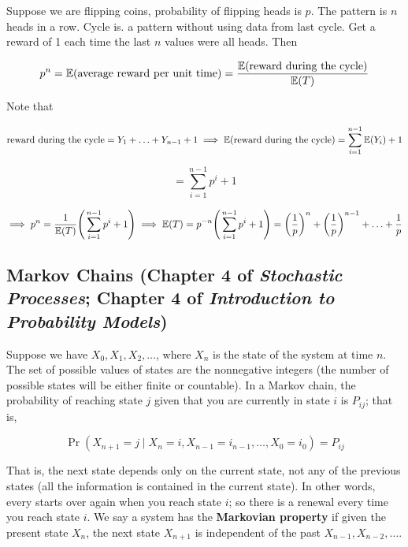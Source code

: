 \begin{example}Suppose we are flipping coins, probability of flipping heads is \(p\). The pattern is \(n\) heads in a row. Cycle is. a pattern without using data from last cycle. Get a reward of 1 each time the last \(n\) values were all heads. Then

\[
p^n = \E( \text{average reward per unit time})  =  \frac{ \E( \text{reward during the cycle}) }{\E(T)}
\]

Note that

\[
\text{reward during the cycle} = Y_1 + \ldots + Y_{n-1} + 1 \implies \E(\text{reward during the cycle} ) = \sum_{i=1}^{n-1} \E(Y_i) + 1  
\]

\[
 = \sum_{i=1}^{n-1} p^i + 1  
\]

\[
\implies p^n = \frac{ 1}{\E(T)} \Bigg( \sum_{i=1}^{n-1} p^i + 1  \Bigg) \implies \E(T) = p^{-n} \Bigg(  \sum_{i=1}^{n-1} p^i + 1 \Bigg) = \bigg( \frac{1}{p} \bigg)^n + \bigg( \frac{1}{p} \bigg)^{n-1} + \ldots + \frac{1}{p}
\]

\end{example}

\subsection{Markov Chains (Chapter 4 of \textit{Stochastic Processes}; Chapter 4 of \textit{Introduction to Probability Models})}

Suppose we have \(X_0, X_1, X_2, \ldots\), where \(X_n\) is the state of the system at time \(n\). The set of possible values of states are the nonnegative integers (the number of possible states will be either finite or countable). In a Markov chain, the probability of reaching state \(j\) given that you are currently in state \(i\) is \(P_{ij}\); that is,

\[
\Pr(X_{n+1} = j \mid X_n =i, X_{n-1} = i_{n-1}, \ldots, X_0 = i_0) = P_{ij}
\]

That is, the next state depends only on the current state, not any of the previous states (all the information is contained in the current state). In other words, every starts over again when you reach state \(i\); so there is a renewal every time you reach state \(i\). We say a system has the \textbf{Markovian property} if given the present state \(X_n\), the next state \(X_{n+1}\) is independent of the past \(X_{n-1}, X_{n-2}, \ldots\).

